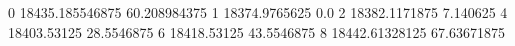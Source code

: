 0 18435.185546875 60.208984375
1 18374.9765625 0.0
2 18382.1171875 7.140625
4 18403.53125 28.5546875
6 18418.53125 43.5546875
8 18442.61328125 67.63671875

